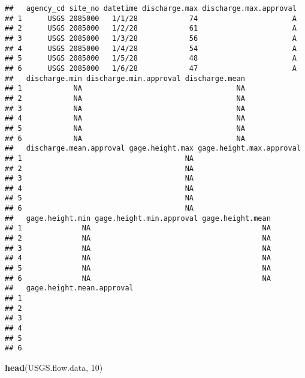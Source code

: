 \documentclass[]{article}
\newenvironment{Shaded}{\begin{snugshade}}{\end{snugshade}}
\newcommand{\KeywordTok}[1]{\textcolor[rgb]{0.13,0.29,0.53}{\textbf{#1}}}
\newcommand{\DecValTok}[1]{\textcolor[rgb]{0.00,0.00,0.81}{#1}}
\newcommand{\NormalTok}[1]{#1}
\begin{document}
\begin{verbatim}
##   agency_cd site_no datetime discharge.max discharge.max.approval
## 1      USGS 2085000   1/1/28            74                      A
## 2      USGS 2085000   1/2/28            61                      A
## 3      USGS 2085000   1/3/28            56                      A
## 4      USGS 2085000   1/4/28            54                      A
## 5      USGS 2085000   1/5/28            48                      A
## 6      USGS 2085000   1/6/28            47                      A
##   discharge.min discharge.min.approval discharge.mean
## 1            NA                                    NA
## 2            NA                                    NA
## 3            NA                                    NA
## 4            NA                                    NA
## 5            NA                                    NA
## 6            NA                                    NA
##   discharge.mean.approval gage.height.max gage.height.max.approval
## 1                                      NA                         
## 2                                      NA                         
## 3                                      NA                         
## 4                                      NA                         
## 5                                      NA                         
## 6                                      NA                         
##   gage.height.min gage.height.min.approval gage.height.mean
## 1              NA                                        NA
## 2              NA                                        NA
## 3              NA                                        NA
## 4              NA                                        NA
## 5              NA                                        NA
## 6              NA                                        NA
##   gage.height.mean.approval
## 1                          
## 2                          
## 3                          
## 4                          
## 5                          
## 6
\end{verbatim}

\begin{Shaded}
\begin{Highlighting}[]
\KeywordTok{head}\NormalTok{(USGS.flow.data, }\DecValTok{10}\NormalTok{)}
\end{Highlighting}
\end{Shaded}
\end{document}

